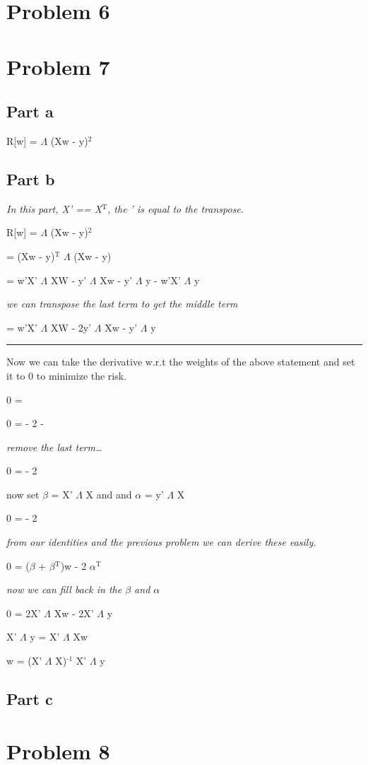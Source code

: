 \documentclass[11pt]{article}
\begin{document}
\section{Problem 6}
\label{sec-6}

\section{Problem 7}
\label{sec-7}
\subsection{Part a}
\label{sec-7-1}

R[w] = $\Lambda$ (Xw - y)$^{\text{2}}$

\subsection{Part b}
\label{sec-7-2}
\emph{In this part, X' == X$^{\text{T}}$, the ' is equal to the transpose.}

R[w] = $\Lambda$ (Xw - y)$^{\text{2}}$

= (Xw - y)$^{\text{T}}$ $\Lambda$ (Xw - y)

= w'X' $\Lambda$ XW - y' $\Lambda$ Xw - y' $\Lambda$ y - w'X' $\Lambda$ y

\emph{we can transpose the last term to get the middle term}

= w'X' $\Lambda$ XW - 2y' $\Lambda$ Xw - y' $\Lambda$ y

\rule{\linewidth}{0.5pt}
Now we can take the derivative w.r.t the weights of the above statement and set it to 0 to minimize the risk.

0 = 

0 =  - 2  - 

\emph{remove the last term\ldots{}}

0 =  - 2 

now set $\beta$ = X' $\Lambda$ X and and $\alpha$ = y' $\Lambda$ X

0 =  - 2 

\emph{from our identities and the previous problem we can derive these easily.}

0 = ($\beta$ + $\beta$$^{\text{T}}$)w  - 2 $\alpha$$^{\text{T}}$

\emph{now we can fill back in the $\beta$ and $\alpha$}

0 = 2X' $\Lambda$ Xw - 2X' $\Lambda$ y

X' $\Lambda$ y = X' $\Lambda$ Xw

w = (X' $\Lambda$ X)$^{\text{-1}}$ X' $\Lambda$ y

\subsection{Part c}
\label{sec-7-3}




\section{Problem 8}
\label{sec-8}
\end{document}
